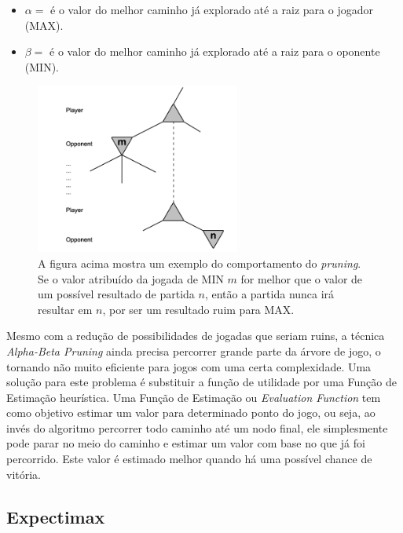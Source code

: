     \begin{itemize}
    
        \item $\alpha = $ é o valor do melhor caminho já explorado até a raiz para o jogador (MAX).
        \item $\beta = $ é o valor do melhor caminho já explorado até a raiz para o oponente (MIN).
    
    \end{itemize}

    \begin{figure}[H]
      \centering
      \includegraphics[width=0.6\textwidth]{pruning-fig1.png}
      \caption{A figura acima mostra um exemplo do comportamento do \textit{pruning}. Se o valor atribuído da jogada de MIN $m$ for melhor que o valor de um possível resultado de partida $n$, então a partida nunca irá resultar em $n$, por ser um resultado ruim para MAX.~\cite[Cap 5, pp167-171]{AIMA}}
    \end{figure}

Mesmo com a redução de possibilidades de jogadas que seriam ruins, a técnica \textit{Alpha-Beta Pruning} ainda precisa percorrer grande parte da árvore de jogo, o tornando não muito eficiente para jogos com uma certa complexidade. Uma solução para este problema é substituir a função de utilidade por uma Função de Estimação heurística.
Uma Função de Estimação ou \textit{Evaluation Function} tem como objetivo estimar um valor para determinado ponto do jogo, ou seja, ao invés do algoritmo percorrer todo caminho até um nodo final, ele simplesmente pode parar no meio do caminho e estimar um valor com base no que já foi percorrido. Este valor é estimado melhor quando há uma possível chance de vitória.~\cite[Cap 5, pp171-175]{AIMA}

\subsection{\label{sec:secao3.3}Expectimax}

